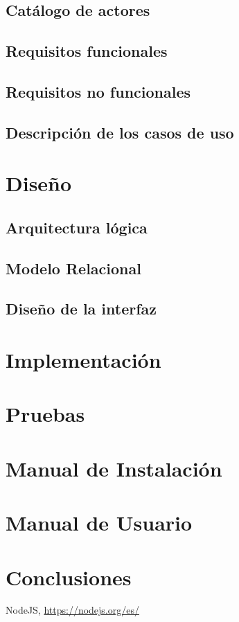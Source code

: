 \documentclass[a4paper, 11pt, dvipsnames]{book}
\begin{document}
    \section{Catálogo de actores}
    \section{Requisitos funcionales}
    \section{Requisitos no funcionales}
    \section{Descripción de los casos de uso}
    \chapter{Diseño}
    \section{Arquitectura lógica}
    \section{Modelo Relacional}
    \section{Diseño de la interfaz}
    \chapter{Implementación}
    \chapter{Pruebas}
    \chapter{Manual de Instalación}
    \chapter{Manual de Usuario}

    \chapter{Conclusiones}
    \begin{thebibliography}{9}
    NodeJS, \url{https://nodejs.org/es/}
    \end{thebibliography}
\end{document}
